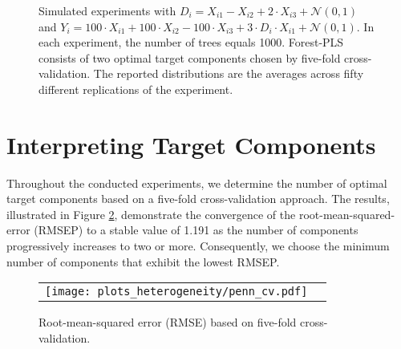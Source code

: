 \documentclass[12pt]{article}
\begin{document}
\begin{figure}[H]
	\centering
    \quad
     \quad 
	\caption{Simulated experiments with  $D_i = X_{i1} - X_{i2} + 2\cdot X_{i3} + \mathcal{N}(0, 1)$ and $Y_i = 100\cdot X_{i1} + 100 \cdot X_{i2} - 100\cdot X_{i3} + 3\cdot D_i \cdot X_{i1} + \mathcal{N}(0, 1)$. In each experiment, the number of trees equals 1000. Forest-PLS consists of two optimal target components chosen by five-fold cross-validation. The reported distributions are the averages across fifty different replications of the experiment.   }\label{fig_group_heterogeneity_nbd}
\end{figure}


\section{Interpreting Target Components}\label{app_expl}

Throughout the conducted experiments, we determine the number of optimal target components based on a five-fold cross-validation approach. The results, illustrated in Figure \ref{fig_cv}, demonstrate the convergence of the root-mean-squared-error (RMSEP) to a stable value of 1.191 as the number of components progressively increases to two or more. Consequently, we choose the minimum number of components that exhibit the lowest RMSEP. 

\begin{figure}[H]
\centering
\begin{tabular}{cc}
\texttt{[image: plots\_heterogeneity/penn\_cv.pdf]} 
\end{tabular}
\caption{Root-mean-squared error (RMSE) based on five-fold cross-validation. }\label{fig_cv}
\end{figure}



\end{document}
